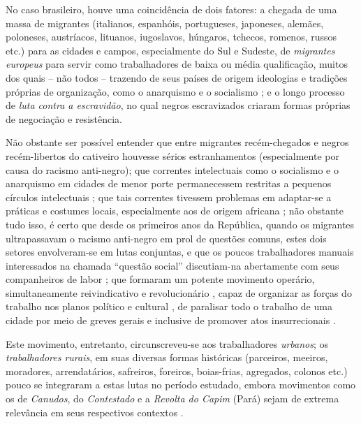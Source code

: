No caso brasileiro, houve uma coincidência de dois fatores: a chegada de uma massa de migrantes (italianos, espanhóis, portugueses, japoneses, alemães, poloneses, austríacos, lituanos, iugoslavos, húngaros, tchecos, romenos, russos etc.) para as cidades e campos, especialmente do Sul e Sudeste, de \textit{migrantes europeus} para servir como trabalhadores de baixa ou média qualificação, muitos dos quais -- não todos -- trazendo de seus países de origem ideologias e tradições próprias de organização, como o anarquismo e o socialismo \cite{petrone_imigra_1977}; e o longo processo de \textit{luta contra a escravidão}, no qual negros escravizados criaram formas próprias de negociação e resistência.

Não obstante ser possível entender que entre migrantes recém-chegados e negros recém-libertos do cativeiro houvesse sérios estranhamentos (especialmente por causa do racismo anti-negro); que correntes intelectuais como o socialismo e o anarquismo em cidades de menor porte permanecessem restritas a pequenos círculos intelectuais \cite{duarte_rebelde_1991}; que tais correntes tivessem problemas em adaptar-se a práticas e costumes locais, especialmente aos de origem africana \cite{goes_formacao_1988}; não obstante tudo isso, é certo que desde os primeiros anos da República, quando os migrantes ultrapassavam o racismo anti-negro em prol de questões comuns, estes dois setores envolveram-se em lutas conjuntas, e que os poucos trabalhadores manuais interessados na chamada ``questão social'' discutiam-na abertamente com seus companheiros de labor \cite[p.~73-85]{gomes_velhos_1988}; que formaram um potente movimento operário, simultaneamente reivindicativo e revolucionário \cite{samis_anabras_2004}, capaz de organizar as forças do trabalho nos planos político e cultural \cite{farinha_federa_2002,hardman_patripatr_2002}, de paralisar todo o trabalho de uma cidade por meio de greves gerais \cite{castellucci_salvador_2001,magnani_anarsp_1982} e inclusive de promover atos insurrecionais \cite{dulles_anacombras_1977,koval_prolbras_1982}. 

Este movimento, entretanto, circunscreveu-se aos trabalhadores \textit{urbanos}; os \textit{trabalhadores rurais}, em suas diversas formas históricas (parceiros, meeiros, moradores, arrendatários, safreiros, foreiros, boias-frias, agregados, colonos etc.) pouco se integraram a estas lutas no período estudado, embora movimentos como os de \textit{Canudos}, do \textit{Contestado} e a \textit{Revolta do Capim} (Pará) sejam de extrema relevância em seus respectivos contextos \cite{mottazarth_rescamp1_2008}. 

